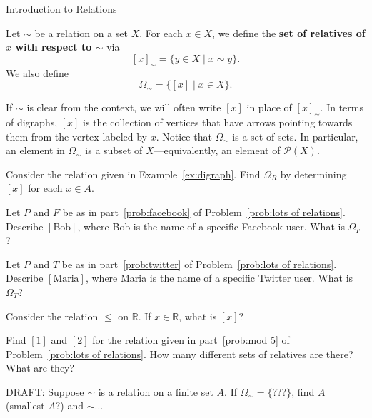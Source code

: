 \begin{section}{Introduction to Relations}
\begin{definition}\label{def:relatives}
Let $\sim$ be a relation on a set $X$. For each $x\in X$, we define the \textbf{set of relatives of $x$ with respect to $\sim$} via
\[
[x]_{\sim}=\{y\in X\mid x\sim y\}.
\]
We also define
\[
\Omega_{\sim}=\{[x]\mid x\in X\}.
\]
\end{definition}

If $\sim$ is clear from the context, we will often write $[x]$ in place of $[x]_{\sim}$.  In terms of digraphs, $[x]$ is the collection of vertices that have arrows pointing towards them from the vertex labeled by $x$. Notice that $\Omega_{\sim}$ is a set of sets.  In particular, an element in $\Omega_{\sim}$ is a subset of $X$---equivalently, an element of $\mathcal{P}(X)$.

\begin{problem}
Consider the relation given in Example~\ref{ex:digraph}. Find $\Omega_R$ by determining $[x]$ for each $x\in A$.
\end{problem}

\begin{problem}
Let $P$ and $F$ be as in part~\ref{prob:facebook} of Problem~\ref{prob:lots of relations}.  Describe $[\text{Bob}]$, where Bob is the name of a specific Facebook user.  What is $\Omega_F$?
\end{problem}

\begin{problem}
Let $P$ and $T$ be as in part~\ref{prob:twitter} of Problem~\ref{prob:lots of relations}.  Describe $[\text{Maria}]$, where Maria is the name of a specific Twitter user.  What is $\Omega_T$?
\end{problem}

\begin{problem}
Consider the relation $\leq$ on $\mathbb{R}$.  If $x\in \mathbb{R}$, what is $[x]$?
\end{problem}

\begin{problem}\label{prob:mod5classes}
Find $[1]$ and $[2]$ for the relation given in part~\ref{prob:mod 5} of Problem~\ref{prob:lots of relations}.  How many different sets of relatives are there?  What are they?
\end{problem}

\begin{problem}
DRAFT: Suppose $\sim$ is a relation on a finite set $A$.  If $\Omega_{\sim}=\{???\}$, find $A$ (smallest $A$?) and $\sim$...
\end{problem}

\end{section}